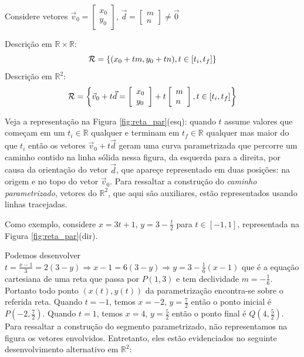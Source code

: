 Considere vetores $\vec{v}_0 = \left[ \begin{array}{l} x_0 \\ y_0 \end{array} \right] $, $\vec{d} = \left[ \begin{array}{l} m \\ n \end{array} \right] \neq \vec{0} $

Descrição em $\mathbb{R}\times \mathbb{R}$:
\begin{equation}
{\cal R} = \left\{ (x_0 + t m, y_0 + t n), t \in [t_i , t_f ] \right\}
\end{equation}
Descrição em $\mathbb{R}^2$:
\begin{equation}
{\cal R} = \left\{ \vec{v}_0 + t \vec{d} = \left[ \begin{array}{l} 
x_0 \\ y_0 \end{array} \right] + t \left[ \begin{array}{l}
m \\ n \end{array} \right], t \in [t_i , t_f ] \right\}
\end{equation}

Veja a representação na Figura \ref{fig:reta_par}(esq): quando $t$ assume valores que começam em um $t_i \in \mathbb{R}$ qualquer e terminam em $t_f \in \mathbb{R}$ qualquer mas maior do que $t_i$ então os vetores $\vec{v}_0 + t \vec{d}$ geram uma curva parametrizada que percorre um caminho contido na linha sólida nessa figura, da esquerda para a direita, por causa da orientação do vetor $\vec{d}$, que apareçe representado em duas posições: na origem e no topo do vetor $\vec{v}_0$. Para ressaltar a construção do {\it caminho parametrizado}, vetores do $\mathbb{R}^2$, que aqui são auxiliares, estão representados usando linhas tracejadas.

Como exemplo, considere $x= 3t + 1$, $y= 3-\frac{t}{2}$ para $ t \in [-1,1]$, representada na Figura \ref{fig:reta_par}(dir). 

Podemos desenvolver $t = \frac{x-1}{3} = 2(3-y) \Rightarrow x-1 = 6(3-y) \Rightarrow y = 3 - \frac{1}{6}(x-1) $ que é a equação cartesiana de uma reta que passa por $P(1,3)$ e tem declividade $m = -\frac{1}{6}$. Portanto todo ponto $(x(t),y(t))$ da parametrização encontra-se sobre o referida reta. Quando $t=-1$, temos $x=-2$, $y=\frac{7}{2}$ então o ponto inicial é $P\left(-2,\frac{7}{2}\right)$. Quando $t=1$,  temos $x=4$, $y=\frac{5}{2}$ então o ponto final é $Q\left(4,\frac{5}{2}\right)$.
Para ressaltar a construção do segmento parametrizado, não representamos na figura os vetores envolvidos. Entretanto, eles estão evidenciados no seguinte desenvolvimento alternativo em $\mathbb{R}^2$:

